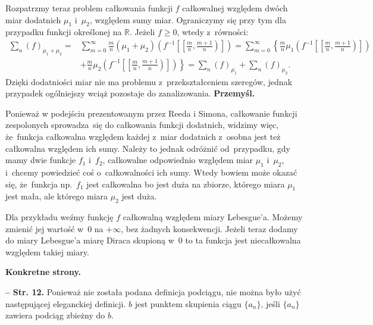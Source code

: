 \documentclass[a4paper,11pt]{article}
\newcommand{\tb}{\textbf}
\newcommand{\noi}{\noindent}
\newcommand{\Str}[1]{\textbf{Str. #1.}}
\newcommand{\Prze}{\textbf{Przemyśl.}}
\begin{document}
Rozpatrzmy teraz problem całkowania funkcji $f$ całkowalnej względem
dwóch miar dodatnich $\mu_{ 1 }$ i~$\mu_{ 2 }$, względem sumy
miar. Ograniczymy się przy tym dla przypadku funkcji określonej na
$\mathbb{R}$. Jeżeli $f \geq 0$, wtedy z~równości:
\begin{displaymath}
  \begin{split}
    \sum_{ n }( f )_{ \mu_{ 1 } + \mu_{ 2 } } =& \sum_{ m = 0 }^{ \infty } \frac{ m }{ n } ( \mu_{ 1 } + \mu_{ 2 } )\left( f^{ -1 }\left[ \left[ \frac{ m }{ n }, \frac{ m + 1 }{ n } \right) \right] \right) = \sum_{ m = 0 }^{ \infty } \left\{ \frac{ m }{ n } \mu_{ 1 }\left( f^{ -1 }\left[ \left[ \frac{ m }{ n }, \frac{ m + 1 }{ n } \right) \right] \right) \right. \\
    &+ \left. \frac{ m }{ n } \mu_{ 2 }\left( f^{ -1 }\left[ \left[
            \frac{ m }{ n }, \frac{ m + 1 }{ n } \right) \right]
      \right) \right\} = \sum_{ n }( f )_{ \mu_{ 1 } } + \sum_{ n }( f
    )_{ \mu_{ 2 } }.
  \end{split}
\end{displaymath}
Dzięki dodatniości miar nie ma problemu z~przekształceniem szeregów,
jednak przypadek ogólniejszy wciąż pozostaje do zanalizowania. \Prze

Ponieważ w podejściu prezentowanym przez Reeda i Simona, całkowanie
funkcji zespolonych sprowadza~się do całkowania funkcji dodatnich,
widzimy więc, że~funkcja całkowalna względem każdej z~miar dodatnich
z~osobna jest też całkowalna względem ich sumy. Należy to jednak
odróżnić od~przypadku, gdy mamy dwie funkcje $f_{ 1 }$ i~$f_{ 2 }$,
całkowalne odpowiednio względem miar $\mu_{ 1 }$ i~$\mu_{ 2 }$,
i~chcemy powiedzieć coś o~całkowalności ich sumy. Wtedy bowiem może
okazać się, że~funkcja np.~$f_{ 1 }$ jest całkowalna bo jest duża na
zbiorze, którego miara $\mu_{ 1 }$ jest mała, ale którego miara
$\mu_{ 2 }$ jest duża.

Dla przykładu weźmy funkcję $f$ całkowalną względem miary
Lebesgue'a. Możemy zmienić jej wartość w~0 na $+\infty$, bez żadnych
konsekwencji. Jeżeli teraz dodamy do miary Lebesgue'a miarę Diraca
skupioną w~0 to ta funkcja jest niecałkowalna względem takiej miary.

\vspace{2em}

\noi \textbf{Konkretne strony.}

\tb{--} \Str{12} Ponieważ nie została podana definicja podciągu, nie
można było użyć następującej eleganckiej definicji. $b$ jest punktem
skupienia ciągu $\{ a_{ n } \}$, jeśli $\{ a_{ n } \}$ zawiera podciąg
zbieżny do $b$.
\end{document}
